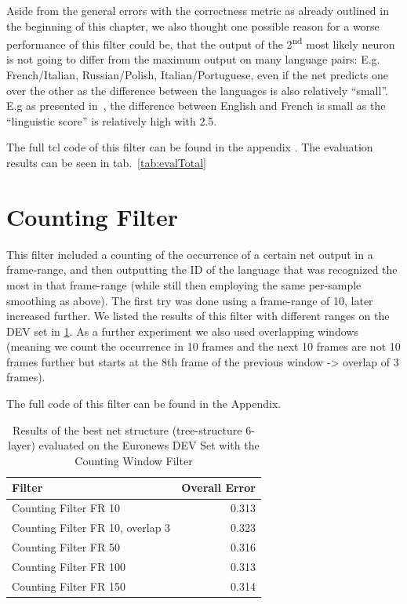 Aside from the general errors with the correctness metric as already outlined in the beginning of this chapter, we also thought one possible reason for a worse performance of this filter could be, that the output of the 2\textsuperscript{nd} most likely neuron is not going to differ from the maximum output on many language pairs: E.g. French/Italian, Russian/Polish, Italian/Portuguese,  even if the net predicts one over the other as the difference between the languages is also relatively ``small''. E.g as presented in~\cite{doi:10.1080/14790710508668395}, the difference between English and French is small as the ``linguistic score'' is relatively high with 2.5. 

The full tcl code of this filter can be found in the appendix . The evaluation results can be seen in tab.~\ref{tab:evalTotal}

\section{Counting Filter}
This filter included a counting of the occurrence of a certain net output in a frame-range, and then outputting the ID of the language that was recognized the most in that frame-range (while still then employing the same per-sample smoothing as above). The first try was done using a frame-range of 10, later increased further. We listed the results of this filter with different ranges on the DEV set in \ref{tab:counting}. As a further experiment we also used overlapping windows (meaning we count the occurrence in 10 frames and the next 10 frames are not 10 frames further but starts at the 8th frame of the previous window -> overlap of 3 frames).

The full code of this filter can be found in the Appendix.

\begin{table}[h!]
\caption{Results of the best net structure (tree-structure 6-layer) evaluated on the Euronews DEV Set with the Counting Window Filter}
\label{tab:counting}
\centering
\begin{tabular}{| l | r |}
	\hline
	\textbf{Filter} & \textbf{Overall Error}  \\
	\hline
	Counting Filter FR 10  & 0.313 \\
	\hline
	Counting Filter FR 10, overlap 3 &  0.323\\
	\hline
	Counting Filter FR 50 & 0.316 \\
	\hline
	Counting Filter FR 100 & 0.313\\
	\hline
	Counting Filter FR 150 & 0.314\\
	\hline
\end{tabular}

\end{table}

